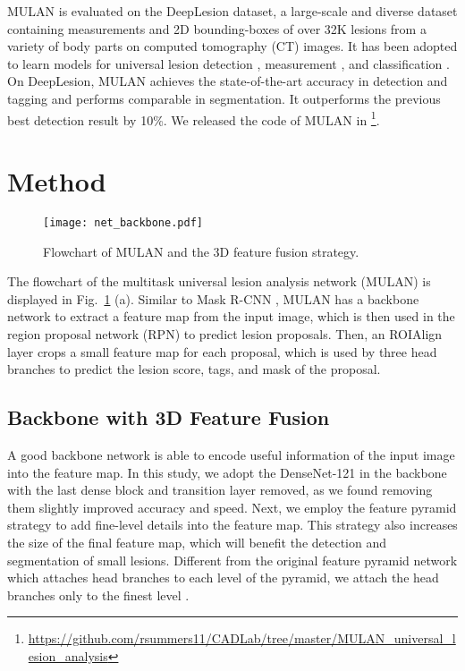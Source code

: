 \documentclass[runningheads]{llncs}
\def\Fig#1{{Fig.\ \ref{fig:#1}}}
\begin{document}
MULAN is evaluated on the DeepLesion \cite{Yan2018DeepLesion} dataset, a large-scale and diverse dataset containing measurements and 2D bounding-boxes of over 32K lesions from a variety of body parts on computed tomography (CT) images. It has been adopted to learn models for universal lesion detection \cite{Yan20183DCE,Tang2019Uldor}, measurement \cite{Tang2018RECIST}, and classification \cite{Yan2019Lesa}. On DeepLesion, MULAN achieves the state-of-the-art accuracy in detection and tagging and performs comparable in segmentation. It outperforms the previous best detection result by 10\%. We released the code of MULAN in \footnote[1]{\small \url{https://github.com/rsummers11/CADLab/tree/master/MULAN_universal_lesion_analysis}}.


\section{Method}
\begin{figure}[]
	\begin{center}
\texttt{[image: net\_backbone.pdf]} \end{center}
\caption{Flowchart of MULAN and the 3D feature fusion strategy.}
	\label{fig:net_backbone}
\end{figure}
The flowchart of the multitask universal lesion analysis network (MULAN) is displayed in \Fig{net_backbone} (a). Similar to Mask R-CNN \cite{He2017MaskRCNN}, MULAN has a backbone network to extract a feature map from the input image, which is then used in the region proposal network (RPN) to predict lesion proposals. Then, an ROIAlign layer \cite{He2017MaskRCNN} crops a small feature map for each proposal, which is used by three head branches to predict the lesion score, tags, and mask of the proposal.

\subsection{Backbone with 3D Feature Fusion}

A good backbone network is able to encode useful information of the input image into the feature map. In this study, we adopt the DenseNet-121 \cite{Huang2017DenseNet} in the backbone with the last dense block and transition layer removed, as we found removing them slightly improved accuracy and speed. Next, we employ the feature pyramid strategy \cite{Lin2016Pyramid} to add fine-level details into the feature map. This strategy also increases the size of the final feature map, which will benefit the detection and segmentation of small lesions. Different from the original feature pyramid network \cite{Lin2016Pyramid} which attaches head branches to each level of the pyramid, we attach the head branches only to the finest level \cite{Liao2019leaky,Wu2018joint}.
\end{document}
